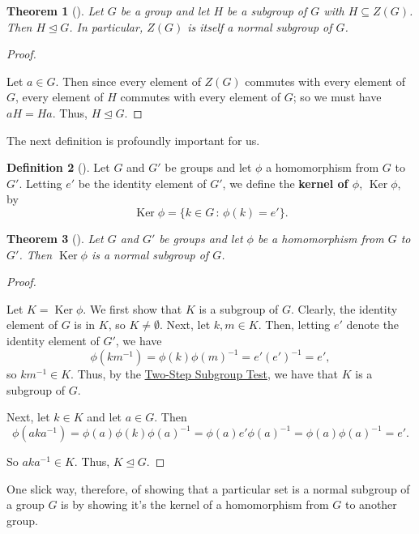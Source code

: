 \documentclass[10pt,]{book}
\newcommand{\terminology}[1]{\textbf{#1}}
\theoremstyle{plain}
\newtheorem{theorem}{Theorem}[section]
\theoremstyle{definition}
\newtheorem{definition}[theorem]{Definition}
\theoremstyle{definition}
\theoremstyle{definition}
\theoremstyle{definition}
\numberwithin{equation}{section}
\DeclareMathOperator{\Ker}{Ker}
\begin{document}
\begin{theorem}[{}]\label{znorm}
Let \(G\) be a group and let \(H\) be a subgroup of \(G\) with \(H\subseteq Z(G)\). Then \(H\unlhd G\). In particular, \(Z(G)\) is itself a normal subgroup of \(G\).%
\end{theorem}
\begin{proof}\hypertarget{proof-48}{}
Let \(a\in G\). Then since every element of \(Z(G)\) commutes with every element of \(G\), every element of \(H\) commutes with every element of \(G\); so we must have \(aH=Ha\). Thus, \(H\unlhd G\).%
\end{proof}
The next definition is profoundly important for us.%
\begin{definition}[{}]\label{definition-69}
\label{notation-75}
Let \(G\) and \(G'\) be groups and let \(\phi\) a homomorphism from \(G\) to \(G'\). Letting \(e'\) be the identity element of \(G'\), we define the \terminology{kernel of \(\phi\)}, \(\Ker
\phi\), by%
\begin{equation*}
\Ker \phi = \{k\in G\,:\,\phi(k)=e'\}.
\end{equation*}
%
\end{definition}
\begin{theorem}[{}]\label{theorem-56}
Let \(G\) and \(G'\) be groups and let \(\phi\) be a homomorphism from \(G\) to \(G'\). Then \(\Ker \phi\) is a normal subgroup of \(G\).%
\end{theorem}
\begin{proof}\hypertarget{proof-49}{}
Let \(K=\Ker \phi\). We first show that \(K\) is a subgroup of \(G\). Clearly, the identity element of \(G\) is in \(K\), so \(K\neq
\emptyset\). Next, let \(k,m\in K\). Then, letting \(e'\) denote the identity element of \(G'\), we have%
\begin{equation*}
\phi(km^{-1})=\phi(k)\phi(m)^{-1}=e'(e')^{-1}=e',
\end{equation*}
so \(km^{-1}\in
K\). Thus, by the \hyperref[twostep]{Two-Step Subgroup Test}, we have that \(K\) is a subgroup of \(G\).%
\par
Next, let \(k\in K\) and let \(a\in G\). Then%
\begin{equation*}
\phi(aka^{-1})=\phi(a)\phi(k)\phi(a)^{-1}=\phi(a)e'\phi(a)^{-1}=\phi(a)\phi(a)^{-1}=e'.
\end{equation*}
%
\par
So \(aka^{-1}\in K\). Thus, \(K \unlhd G\).%
\end{proof}
One slick way, therefore, of showing that a particular set is a normal subgroup of a group \(G\) is by showing it's the kernel of a homomorphism from \(G\) to another group.%
\end{document}
